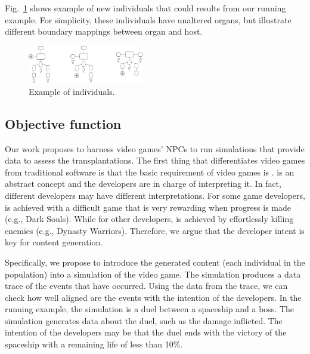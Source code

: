 Fig.~\ref{fig:candidates} shows example of new individuals that could results from our running example. For simplicity, these individuals have unaltered organs, but illustrate different boundary mappings between organ and host.

\begin{figure}[h]
    \centering
    \includegraphics[width=0.45\textwidth]{Figures/candidates.png}
    \caption{Example of individuals.}
    \label{fig:candidates}
\end{figure}

\subsection{Objective function}

Our work proposes to harness video games' NPCs to run simulations that provide data to assess the transplantations. The first thing that differentiates video games from traditional software is that the basic requirement of video games is .  is an abstract concept and the developers are in charge of interpreting it. In fact, different developers may have different interpretations. For some game developers,  is achieved with a difficult game that is very rewarding when progress is made (e.g., Dark Souls). While for other developers,  is achieved by effortlessly killing enemies (e.g., Dynasty Warriors). Therefore, we argue that the developer intent is key for content generation.

Specifically, we propose to introduce the generated content (each individual in the population) into a simulation of the video game. The simulation produces a data trace of the events that have occurred. Using the data from the trace, we can check how well aligned are the events with the intention of the developers. In the running example, the simulation is a duel between a spaceship and a boss. The simulation generates data about the duel, such as the damage inflicted. The intention of the developers may be that the duel ends with the victory of the spaceship with a remaining life of less than 10\%.

